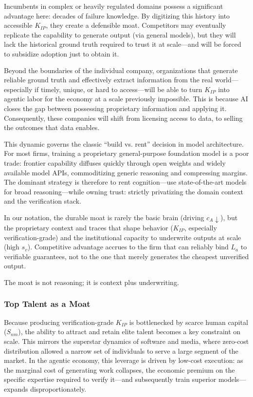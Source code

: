 \documentclass[12pt, letter]{article}
\begin{document}
\begin{itemize}
Incumbents in complex or heavily regulated domains possess a significant advantage here: decades of failure knowledge. By digitizing this history into accessible $K_{IP}$, they create a defensible moat. Competitors may eventually replicate the capability to generate output (via general models), but they will lack the historical ground truth required to trust it at scale—and will be forced to subsidize adoption just to obtain it.

Beyond the boundaries of the individual company, organizations that generate reliable ground truth and effectively extract information from the real world—especially if timely, unique, or hard to access—will be able to turn $K_{IP}$ into agentic labor for the economy at a scale previously impossible. This is because AI closes the gap between possessing proprietary information and applying it. Consequently, these companies will shift from licensing access to data, to selling the outcomes that data enables.

This dynamic governs the classic ``build vs. rent'' decision in model architecture. For most firms, training a proprietary general-purpose foundation model is a poor trade: frontier capability diffuses quickly through open weights and widely available model APIs, commoditizing generic reasoning and compressing margins. The dominant strategy is therefore to rent cognition—use state-of-the-art models for broad reasoning—while owning trust: strictly privatizing the domain context and the verification stack.

In our notation, the durable moat is rarely the basic brain (driving $c_A \downarrow$), but the proprietary context and traces that shape behavior ($K_{IP}$, especially verification-grade) and the institutional capacity to underwrite outputs at scale (high $s_v$). Competitive advantage accrues to the firm that can reliably bind $L_a$ to verifiable guarantees, not to the one that merely generates the cheapest unverified output.

The moat is not reasoning; it is context plus underwriting.

\end{itemize}

\subsubsection{Top Talent as a Moat}

Because producing verification-grade $K_{IP}$ is bottlenecked by scarce human capital ($S_{nm}$), the ability to attract and retain elite talent becomes a key constraint on scale. This mirrors the superstar dynamics of software and media, where zero-cost distribution allowed a narrow set of individuals to serve a large segment of the market. In the agentic economy, this leverage is driven by low-cost execution: as the marginal cost of generating work collapses, the economic premium on the specific expertise required to verify it—and subsequently train superior models—expands disproportionately.
\end{document}

